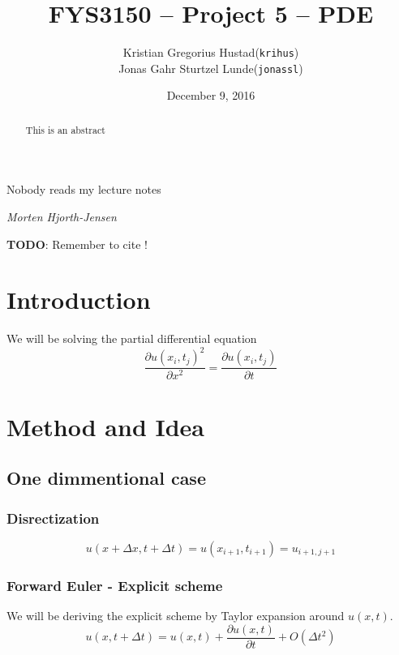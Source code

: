 \documentclass[10pt,a4paper]{article}
\begin{document}
\title{FYS3150 -- Project 5 -- PDE}
\author{
	\begin{tabular}{rl}
        Kristian Gregorius Hustad & (\texttt{krihus})\\
        Jonas Gahr Sturtzel Lunde & (\texttt{jonassl})
	\end{tabular}}
\date{December 9, 2016}
\maketitle



\setlength{\epigraphwidth}{0.75\textwidth}
\renewcommand{\epigraphflush}{center}
\renewcommand{\beforeepigraphskip}{50pt}
\renewcommand{\afterepigraphskip}{100pt}
\renewcommand{\epigraphsize}{\normalsize}
\epigraph{Nobody reads my lecture notes}
	{\textit{Morten Hjorth-Jensen}}

\begin{abstract}
\noindent
This is an abstract
\end{abstract}

\pagebreak




\textbf{TODO}: Remember to cite \cite{hpl_fdm}!

\section{Introduction}
We will be solving the partial differential equation 
\begin{equation}\label{eqn:PDE}
\frac{\partial u(x_i,t_j)^2}{\partial x^2} = \frac{\partial u(x_i,t_j)}{\partial t}
\end{equation}

\section{Method and Idea}
\subsection{One dimmentional case}
\subsubsection{Disrectization}
\begin{equation}
u(x+\Delta x, t+\Delta t) = u(x_{i+1},t_{i+1}) = u_{i+1,j+1}
\end{equation}

\subsubsection{Forward Euler - Explicit scheme}
We will be deriving the explicit scheme by Taylor expansion around $u(x,t)$.
\begin{equation}
u(x,t+\Delta t) = u(x,t) + \frac{\partial u(x,t)}{\partial t} + O(\Delta t^2)
\end{equation}
\end{document}
